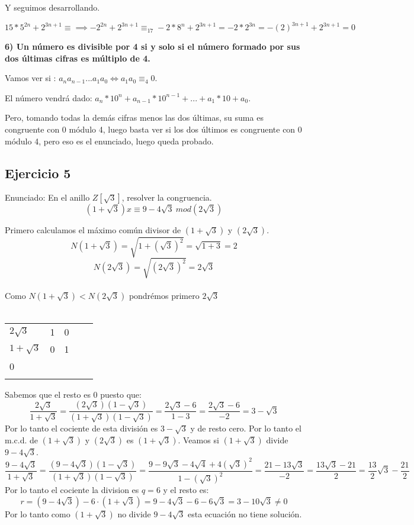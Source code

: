 \documentclass[11pt, a4paper, titlepage]{article}
\begin{document}
Y seguimos desarrollando.

\[
 15*5^{2n} + 2^{3n+1} \equiv  \implies -2^{2n} + 2^{3n+1} \equiv_{17} -2*8^n + 2^{3n+1} = -2*2^{3n} = -(2)^{3n+1} + 2^{3n+1} = 0
\]

\textbf{6) Un número es divisible por 4 si y solo si el número formado por sus dos
últimas cifras es múltiplo de 4.}

Vamos ver si : $a_n a_{n-1}...a_1a_0 \iff a_1 a_0 \equiv_4 0$.

El número vendrá dado: $a_n*10^{n}+ a_{n-1}*10^{n-1} + ... + a_1 * 10 + a_0$.

Pero, tomando todas la demás cifras menos las dos últimas, su suma es congruente con 0 módulo 4, luego  basta ver si los dos últimos es congruente con 0 módulo 4, pero eso es el enunciado, luego queda probado.


\subsection{\LARGE{Ejercicio 5}}

Enunciado: En el anillo $Z[\sqrt3]$, resolver la congruencia.
$$ (1+ \sqrt3)x \equiv 9 - 4\sqrt3 \ mod(2\sqrt3)$$

Primero calculamos el máximo común divisor de $(1 + \sqrt 3)$ y $(2\sqrt3)$.\\
$$ N(1 + \sqrt3) = \sqrt{1 + {(\sqrt3)}^{2}} = \sqrt{1 + 3} = 2 $$
$$ N(2 \sqrt 3) = \sqrt{{(2\sqrt3)}^{2}} =  2\sqrt3 $$\\
Como $N(1 + \sqrt3) < N(2 \sqrt 3)$ pondrémos primero $2 \sqrt3$\\ \\
\begin{tabular}{lllll}
\multicolumn{1}{l|}{$2\sqrt3$}    & 1 & 0 &  &  \\
\multicolumn{1}{l|}{$1 + \sqrt3$} & 0 & 1 &  &  \\
\multicolumn{1}{l|}{0} &   &   &  &  \\
                                &   &   &  & 
\end{tabular}

Sabemos que el resto es 0 puesto que:\\
$$ \frac{2 \sqrt3}{1 + \sqrt3} = \frac{(2\sqrt3)(1 - \sqrt3)}{(1 + \sqrt3)(1 - \sqrt3)} = \frac{2 \sqrt3 - 6}{1 - 3} = \frac{2\sqrt3 - 6}{-2} = 3 - \sqrt3 $$
Por lo tanto el cociente de esta división es $ 3 - \sqrt3 $ y de resto cero. Por lo tanto el m.c.d. de $(1 + \sqrt 3)$ y $(2\sqrt3)$ es $(1 + \sqrt 3)$. Veamos si $(1 + \sqrt 3)$ divide $ 9 -4 \sqrt3$.\\
$$ \frac{9 - 4\sqrt3}{1 + \sqrt3} = \frac{(9 - 4\sqrt3)(1 - \sqrt3)}{(1 + \sqrt3)(1 - \sqrt3)} = \frac{9 - 9\sqrt3 - 4\sqrt4 + 4{(\sqrt3)}^{2}}{1 - {(\sqrt3)}^{2} } = \frac{21 -13\sqrt3}{-2} = \frac{13\sqrt3 - 21}{2} = \frac{13}{2}\sqrt3 - \frac{21}{2}$$
Por lo tanto el cociente la division es $q = 6$ y el resto es: \\
$$r = (9 -4\sqrt3) - 6 \cdot (1 + \sqrt3) = 9 -4\sqrt3 - 6 -6\sqrt3 = 3 - 10\sqrt{3} \neq 0$$ 
Por lo tanto como $(1 + \sqrt 3)$ no divide $ 9 -4 \sqrt3$ esta ecuación no tiene solución.
\end{document}
